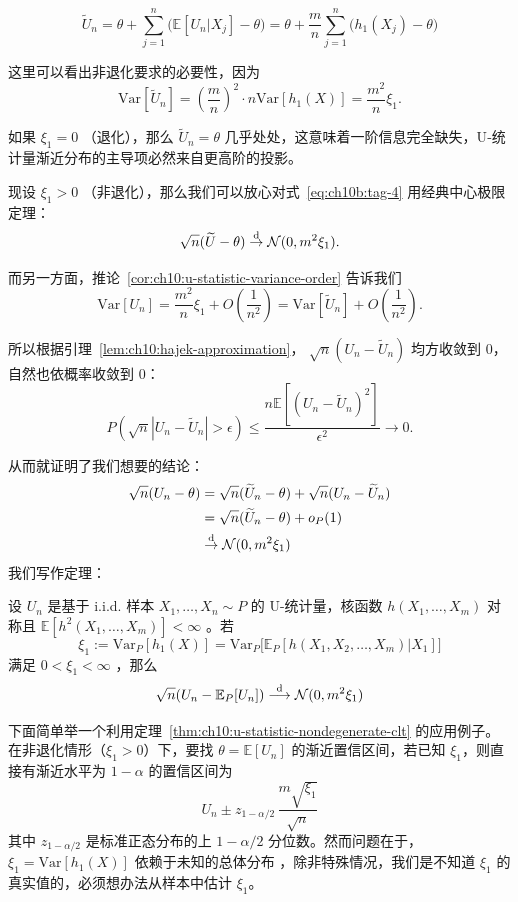\begin{equation}
\label{eq:ch10b:tag-4}
\widetilde{U}_n = \theta + \sum_{j=1}^n \bigl( \mathbb{E}[U_n|X_j] - \theta \bigr) = \theta + \frac{m}{n}\sum_{j=1}^n \bigl( h_1(X_j) - \theta \bigr)
\end{equation}

这里可以看出非退化要求的必要性，因为
\[
\mathrm{Var}[\widetilde U_n]=\left(\frac mn\right)^2\cdot n\mathrm{Var}[h_1(X)]=\frac{m^2}n\xi_1.
\]

如果 $\xi_1=0$ （退化），那么 $\widetilde U_n=\theta$ 几乎处处，这意味着一阶信息完全缺失，U‑统计量渐近分布的主导项必然来自更高阶的投影。

现设 $\xi_1>0$ （非退化），那么我们可以放心对式~\eqref{eq:ch10b:tag-4} 用经典中心极限定理：
\[
\sqrt n(\widetilde U-\theta)\overset{\rm d}\to \mathcal N(0,m^2\xi_1).
\]

而另一方面，推论~\ref{cor:ch10:u-statistic-variance-order} 告诉我们
\[
\mathrm{Var}[U_n]=\frac{m^2}{n}\xi_1+O\left(\frac1{n^2}\right)=\mathrm{Var}[\widetilde U_n]+O\left(\frac1{n^2}\right).
\]

所以根据引理~\ref{lem:ch10:hajek-approximation}， $\sqrt{n}(U_n-\widetilde U_n)$ 均方收敛到 0，自然也依概率收敛到 0：
\[
P(\sqrt n|U_n-\widetilde U_n|>\epsilon)\le\frac{n\mathbb E[(U_n-\widetilde U_n)^2]}{\epsilon^2}\to 0.
\]

从而就证明了我们想要的结论：
\[\begin{aligned} \sqrt n(U_n-\theta)&=\sqrt n(\widetilde U_n-\theta)+\sqrt n(U_n-\widetilde U_n)\\ &=\sqrt n(\widetilde U_n-\theta)+o_P(1)\\ &\overset{\rm d}\to\mathcal N(0,m^2\xi_1) \end{aligned}\]
我们写作定理：

\begin{theorem}\label{thm:ch10:u-statistic-nondegenerate-clt}

设 $U_n$ 是基于 i.i.d. 样本 $X_1,\dots,X_n\sim P$ 的 U-统计量，核函数 $h(X_1,\dots,X_m)$ 对称且 $\mathbb E[h^2(X_1,\dots,X_m)]<\infty$ 。若 \[ \xi_1:=\mathrm{Var}_P[h_1(X)]=\mathrm{Var}_P\big[\mathbb{E}_P[h(X_1,X_2,\dots,X_m)|X_1]\big] \]满足 $0<\xi_1<\infty$ ，那么
\[\sqrt n(U_n-\mathbb E_P[U_n])\overset{\rm d}\longrightarrow \mathcal N(0,m^2\xi_1)\]
\end{theorem}

下面简单举一个利用定理~\ref{thm:ch10:u-statistic-nondegenerate-clt} 的应用例子。在非退化情形（$\xi_1 > 0$）下，要找 $\theta=\mathbb E[U_n]$ 的渐近置信区间，若已知 $\xi_1$，则直接有渐近水平为 $1-\alpha$ 的置信区间为
\[U_n \pm z_{1-\alpha/2}\, \frac{m\sqrt{\xi_1}}{\sqrt{n}}\]
其中 $z_{1-\alpha/2}$ 是标准正态分布的上 $1-\alpha/2$ 分位数。然而问题在于， $\xi_1 = \mathrm{Var}[h_1(X)]$ 依赖于未知的总体分布 ，除非特殊情况，我们是不知道 $\xi_1$ 的真实值的，必须想办法从样本中估计 $\xi_1$。

